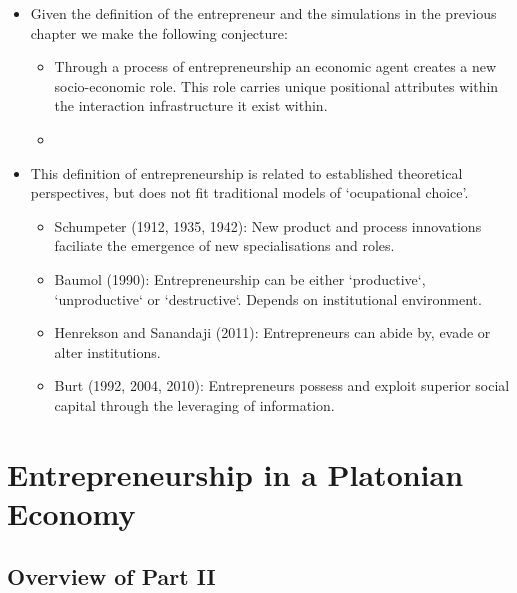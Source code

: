 \documentclass[10pt]{beamer}
\begin{document}
\begin{frame}
\begin{itemize}
\item Given the definition of the entrepreneur and the simulations in the previous chapter we make the following conjecture:
\begin{itemize}
\medskip
\item Through a process of entrepreneurship an economic agent creates a new socio-economic role. This role carries unique positional
attributes within the interaction infrastructure it exist within.
\medskip
\item
\end{itemize}
\end{itemize}
\end{frame}


\begin{frame}
\begin{itemize}
\item This definition of entrepreneurship is related to established theoretical perspectives, but does not fit traditional models of `ocupational choice'.
\begin{itemize}
\medskip
\item Schumpeter (1912, 1935, 1942): New product and process innovations faciliate the emergence of new specialisations and roles.
\medskip
\item Baumol (1990): Entrepreneurship can be either `productive`, `unproductive` or `destructive`. Depends on institutional environment.
\medskip
\item Henrekson and Sanandaji (2011): Entrepreneurs can abide by, evade or alter institutions.
\medskip
\item Burt (1992, 2004, 2010): Entrepreneurs possess and exploit superior social capital through the leveraging of information.
\end{itemize}
\end{itemize}
\end{frame}

\section{Entrepreneurship in a Platonian Economy}

\subsection{Overview of Part II}
\end{document}
